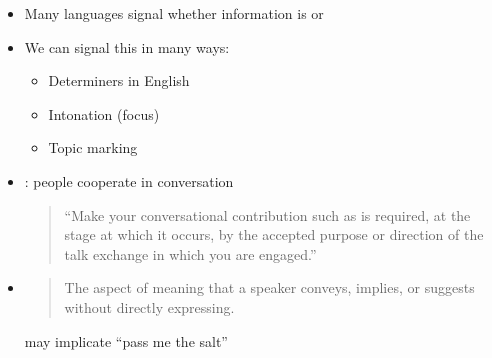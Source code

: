 \documentclass[headrule,footrule]{foils}
\begin{document}

\begin{itemize}
\item Many languages signal whether information is  or 

\item We can signal this in many ways:
  \begin{itemize}
  \item Determiners in English
  \item Intonation (focus)
  \item Topic marking
  \end{itemize}
\end{itemize}



\begin{itemize}
\item {}: people cooperate in conversation
  \begin{quote}
    ``Make your conversational contribution such as is required, at the stage at which it occurs, by the accepted purpose or direction of the talk exchange in which you are engaged.''
  \end{quote}
\item {}
  \begin{quote}
    The aspect of meaning that a speaker conveys, implies, or suggests
    without directly expressing.
  \end{quote}
  may implicate ``pass me the salt''
\end{itemize}
\end{document}
